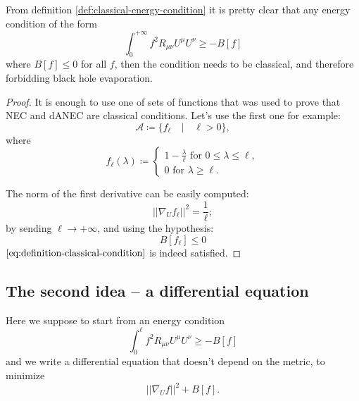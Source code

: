 	\begin{corollary}
		From definition \ref{def:classical-energy-condition} it is pretty clear that any energy condition of the form
		\[
			\int_0^{+\infty} f^2 R_{\mu\nu}U^{\mu}U^{\nu} \ge -B[f]	
		\]
		where \(B[f] \le 0\) for all \(f\), then the condition needs to be classical, and therefore forbidding black hole evaporation.
	\end{corollary}
	\begin{proof}
		It is enough to use one of sets of functions that was used to prove that NEC and dANEC are classical conditions. Let's use the first one for example:
		\[
		\mathcal{A} \coloneqq \{f_{\ell} \quad\vert\quad \ell >0\},
		\]
		where
		\[
			f_{\ell}(\lambda) \coloneqq
			\begin{cases}
				 1 - \frac{\lambda}{\ell} \text{ for } 0 \le \lambda \le \ell, \\	
				0 \text{ for } \lambda \ge \ell.
			\end{cases}
		\]

		The norm of the first derivative can be easily computed:
		\[
			\vert \vert \nabla_U f_{\ell} \vert\vert^2 	= \frac{1}{\ell};
		\]
		by sending \(\ell \rightarrow +\infty\), and using the hypothesis:
		\[
			B[f_{\ell}] \le 0	
		\]
		\(\eqref{eq:definition-classical-condition}\) is indeed satisfied.
	\end{proof}
	
	\subsection{The second idea -- a differential equation}
	Here we suppose to start from an energy condition
	\[
		\int_0^{\ell} f^2 R_{\mu\nu}U^{\mu}U^{\nu} \ge -B[f]
	\]
	and we write a differential equation that doesn't depend on the metric, to minimize 
	\[
	\vert\vert \nabla_U f\vert\vert^2 + B[f].	
	\]
	
	

